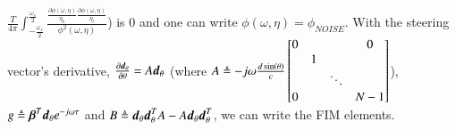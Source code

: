 $
\frac{T}{4\pi}
\int_{-\frac{\omega_{s}}{2}}^{\frac{\omega_{s}}{2}}
\frac{
\frac{\partial\phi\left(\omega,\eta\right)}{\eta_{k}}
\frac{\partial\phi\left(\omega,\eta\right)}{\eta_{l}}
}
{\phi^{2}\left(\omega,\eta\right)} 
$) is $0$ and one can write $\phi\left(\omega,\eta\right) = \phi_{NOISE}$. With the steering vector's derivative, 
$
\frac{\partial \boldsymbol{d}_{\theta}}{\partial\theta} = A\boldsymbol{d}_{\theta}
$ (where
$
A \triangleq
-j\omega\frac{d\sin\left(\theta\right)}{c}
\begin{bmatrix}
0                   &       &           &\mbox{\huge{0}}\\
                    &    1  &           &               \\
                    &       &   \ddots  &               \\
\mbox{\huge{0}}     &       &           & N-1           \\
\end{bmatrix}
$), $g \triangleq \boldsymbol{\beta}^{T}\boldsymbol{d}_{\theta}e^{-j\omega\tau}$ and $B \triangleq \boldsymbol{d}_{\theta}\boldsymbol{d}^{T}_{\theta}A - A\boldsymbol{d}_{\theta}\boldsymbol{d}^{T}_{\theta}$, we can write the FIM elements.
\\
\ifdefined\showDev
